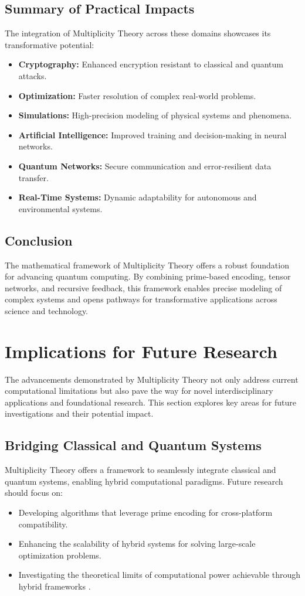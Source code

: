 \documentclass{article}
\theoremstyle{plain}
\begin{document}
\subsection{Summary of Practical Impacts}
The integration of Multiplicity Theory across these domains showcases its transformative potential:
\begin{itemize}
    \item \textbf{Cryptography:} Enhanced encryption resistant to classical and quantum attacks.
    \item \textbf{Optimization:} Faster resolution of complex real-world problems.
    \item \textbf{Simulations:} High-precision modeling of physical systems and phenomena.
    \item \textbf{Artificial Intelligence:} Improved training and decision-making in neural networks.
    \item \textbf{Quantum Networks:} Secure communication and error-resilient data transfer.
    \item \textbf{Real-Time Systems:} Dynamic adaptability for autonomous and environmental systems.
\end{itemize}
\subsection{Conclusion}
The mathematical framework of Multiplicity Theory offers a robust foundation for advancing quantum computing. By combining prime-based encoding, tensor networks, and recursive feedback, this framework enables precise modeling of complex systems and opens pathways for transformative applications across science and technology.
\section{Implications for Future Research}

The advancements demonstrated by Multiplicity Theory not only address current computational limitations but also pave the way for novel interdisciplinary applications and foundational research. This section explores key areas for future investigations and their potential impact.

\subsection{Bridging Classical and Quantum Systems}
Multiplicity Theory offers a framework to seamlessly integrate classical and quantum systems, enabling hybrid computational paradigms. Future research should focus on:
\begin{itemize}
    \item Developing algorithms that leverage prime encoding for cross-platform compatibility.
    \item Enhancing the scalability of hybrid systems for solving large-scale optimization problems.
    \item Investigating the theoretical limits of computational power achievable through hybrid frameworks \cite{preskill2018quantum}.
\end{itemize}
\end{document}
